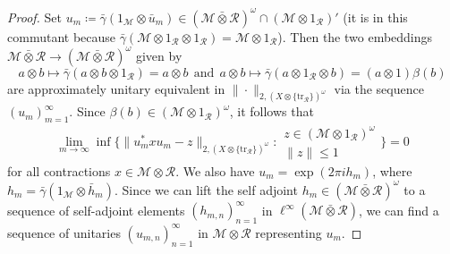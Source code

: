 \documentclass[10pt,a4paper]{amsart}
\newcommand{\M}{\mathcal{M}}
\newcommand{\R}{\mathcal R}
\newcommand{\barotimes}{\bar\otimes}
\newcommand{\tr}{\mathrm{tr}}
\begin{document}
\begin{proof}
Set $u_m \coloneqq \bar{\gamma}(1_{\M} \otimes \bar{u}_m) \in (\M \barotimes \R)^\omega \cap (\M \otimes 1_\R)'$ (it is in this commutant because $\bar\gamma(\M \otimes 1_\R \otimes 1_\R) = \M \otimes 1_\R$).
Then the two embeddings $\M \barotimes \R \rightarrow (\M \barotimes \R)^\omega$ given by 
\begin{equation}
    a \otimes b \mapsto \bar{\gamma}(a \otimes b \otimes 1_\R)=a\otimes b\ \ \text{and}\ \  a \otimes b \mapsto \bar{\gamma}(a \otimes 1_\R \otimes b)=(a\otimes 1)\beta(b)
\end{equation}
are approximately unitary equivalent in $\|\cdot\|_{2,(X \otimes \{\tr_\R\})^\omega}$ via the sequence $(u_m)_{m=1}^\infty$.
Since $\beta(b)\in (\M\otimes 1_{\R})^\omega$, it follows that
\begin{equation}\label{eqn:inf-formula}
	\lim_{m\to\infty} \inf\Big\{ \|u_m^* x u_m - z\|_{2,(X \otimes \{\tr_\R\})^\omega}: \begin{matrix}z \in (\M \otimes 1_\R)^\omega \\ \|z\| \leq 1\end{matrix}\Big\} = 0
\end{equation}
for all contractions $x \in \M \otimes \R$. We also have $u_m = \exp(2\pi i h_m)$, where $h_m = \bar{\gamma}(1_{\M} \otimes \bar{h}_m)$. Since we can lift the self adjoint $h_m \in (\M \barotimes \R)^\omega$ to a sequence of self-adjoint elements $(h_{m,n})_{n=1}^\infty$ in $\ell^\infty(\M \barotimes \R)$, we can find a sequence of unitaries $(u_{m,n})_{n=1}^\infty$ in $\M \otimes \R$ representing $u_m$. 


\end{proof}
\end{document}
